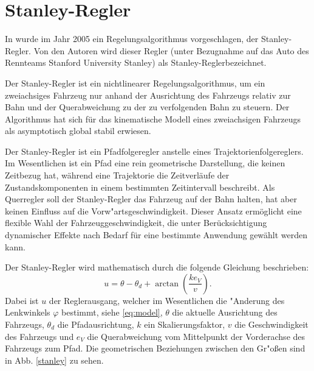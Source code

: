 \documentclass[arbeit=studie,oneside,BCOR=12mm]{ArbeitRST}
\begin{document}
\section{Stanley-Regler}

In \cite{stanley} wurde im Jahr 2005 ein Regelungsalgorithmus vorgeschlagen,
der Stanley-Regler. Von den Autoren wird dieser Regler (unter Bezugnahme auf
das Auto des Rennteams Stanford University \glqq Stanley\grqq) als
\glqq Stanley-Regler\grqq bezeichnet.

Der Stanley-Regler ist ein nichtlinearer Regelungsalgorithmus, um ein
zweiachsiges Fahrzeug nur anhand der Ausrichtung des Fahrzeugs relativ zur Bahn
und der Querabweichung zu der zu verfolgenden Bahn zu steuern. Der Algorithmus hat
sich für das kinematische Modell eines zweiachsigen Fahrzeugs als asymptotisch
global stabil erwiesen. \cite{stanley}

Der Stanley-Regler ist ein Pfadfolgeregler anstelle eines
Trajektorienfolgereglers. Im Wesentlichen ist ein Pfad eine rein geometrische
Darstellung, die keinen Zeitbezug hat, während eine Trajektorie die
Zeitverläufe der Zustandskomponenten in einem bestimmten Zeitintervall
beschreibt. Als Querregler soll der Stanley-Regler das Fahrzeug auf der Bahn halten, hat aber
keinen Einfluss auf die Vorw"artsgeschwindigkeit. Dieser Ansatz ermöglicht eine
flexible Wahl der Fahrzeuggeschwindigkeit, die unter Berücksichtigung
dynamischer Effekte nach Bedarf für eine bestimmte Anwendung gewählt werden
kann. \cite{stanley}

Der Stanley-Regler wird mathematisch durch die folgende Gleichung beschrieben:
\begin{equation} 
  u = \theta - \theta_d + \arctan\left(\frac{ke_{V}}{v}\right).
  \label{eq:Stanley-Regler} 
\end{equation}
Dabei ist $u$ der Reglerausgang, welcher im Wesentlichen die "Anderung des Lenkwinkels $\varphi$
bestimmt, siehe \eqref{eq:model}, $\theta$ die aktuelle Ausrichtung des Fahrzeugs,
$\theta_d$ die Pfadausrichtung, $k$ ein Skalierungsfaktor, $v$ die
Geschwindigkeit des Fahrzeugs und $e_{V}$ die Querabweichung vom Mittelpunkt
der Vorderachse des Fahrzeugs zum Pfad. Die geometrischen Beziehungen zwischen
den Gr"o{\ss}en sind in Abb. \ref{stanley} zu sehen.
\end{document}
